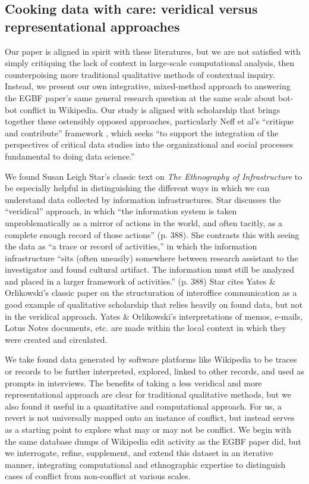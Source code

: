 \documentclass[format=acmsmall, review=false, screen=true]{acmart}%
\begin{document}
\subsection{Cooking data with care: veridical versus representational approaches} \label{s:epist:cooking}
Our paper is aligned in spirit with these literatures, but we are not satisfied with simply critiquing the lack of context in large-scale computational analysis, then counterpoising more traditional qualitative methods of contextual inquiry. Instead, we present our own integrative, mixed-method approach to answering the EGBF paper's same general research question at the same scale about bot-bot conflict in Wikipedia. Our study is aligned with scholarship that brings together these ostensibly opposed approaches, particularly Neff et al's ``critique and contribute'' framework \cite{Neff2017}, which seeks ``to support the integration of the perspectives of critical data studies into the organizational and social processes fundamental to doing data science.'' 

We found Susan Leigh Star's classic text on \textit{The Ethnography of Infrastructure} \cite{star1999} to be especially helpful in distinguishing the different ways in which we can understand data collected by information infrastructures. Star discusses the ``veridical'' approach, in which ``the information system is taken unproblematically as a mirror of actions in the world, and often tacitly, as a complete enough record of those actions'' (p. 388). She contrasts this with seeing the data as ``a trace or record of activities,'' in which the information infrastructure ``sits (often uneasily) somewhere between research assistant to the investigator and found cultural artifact. The information must still be analyzed and placed in a larger framework of activities.'' (p. 388) Star cites Yates \& Orlikowski's classic paper on the structuration of interoffice communication \cite{Yates1992} as a good example of qualitative scholarship that relies heavily on found data, but not in the veridical approach. Yates \& Orlikowski's interpretations of memos, e-mails, Lotus Notes documents, etc. are made within the local context in which they were created and circulated.

We take found data generated by software platforms like Wikipedia to be traces or records to be further interpreted, explored, linked to other records, and used as prompts in interviews. The benefits of taking a less veridical and more representational approach are clear for traditional qualitative methods, but we also found it useful in a quantitative and computational approach. For us, a revert is not universally mapped onto an instance of conflict, but instead serves as a starting point to explore what may or may not be conflict. We begin with the same database dumps of Wikipedia edit activity as the EGBF paper did, but we interrogate, refine, supplement, and extend this dataset in an iterative manner, integrating computational and ethnographic expertise to distinguish cases of conflict from non-conflict at various scales.
\end{document}

